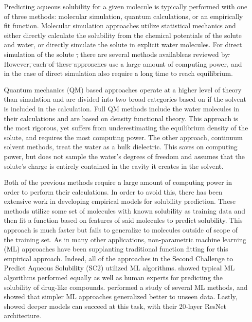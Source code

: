 \documentclass[journal=jcim,manuscript=applicationnotes]{achemso} %
\providecommand{\DIFaddtex}[1]{{\protect\color{blue}\uwave{#1}}} %
\providecommand{\DIFdeltex}[1]{{\protect\color{red}\sout{#1}}}                      %
\providecommand{\DIFaddbegin}{} %
\providecommand{\DIFaddend}{} %
\providecommand{\DIFdelbegin}{} %
\providecommand{\DIFdelend}{} %
\providecommand{\DIFadd}[1]{\texorpdfstring{\DIFaddtex{#1}}{#1}} %
\providecommand{\DIFdel}[1]{\texorpdfstring{\DIFdeltex{#1}}{}} %
\begin{document}
Predicting aqueous solubility for a given molecule is typically performed with one of three methods: molecular simulation, quantum calculations, or an empirically fit function.
Molecular simulation approaches utilize statistical mechanics and either directly calculate the solubility from the chemical potentials of the solute and water\cite{denseStates}, or directly simulate the solute in explicit water molecules.
For direct simulation of the solute \DIFdelbegin \DIFdel{, }\DIFdelend there are several methods available\DIFaddbegin \DIFadd{, }\DIFaddend as reviewed by\citet{solrev1}\DIFdelbegin \DIFdel{.
However, each of these approaches }\DIFdelend \DIFaddbegin \DIFadd{, which all }\DIFaddend use a large amount of computing power, and in the case of direct simulation also require a long time to reach equilibrium.

Quantum mechanics (QM) based approaches operate at a higher level of theory than simulation and are divided into two broad categories based on if the solvent is included in the calculation. 
Full QM methods include the water molecules in their calculations and are based on density functional theory\cite{solrev1}.
This approach is the most rigorous, yet suffers from underestimating the equilibrium density of the solute\cite{solrev1}, and requires the most computing power.
The other approach, continuum solvent methods, treat the water as a bulk dielectric.
This saves on computing power, but does not sample the water's degrees of freedom and assumes that the solute's charge is entirely contained in the cavity it creates in the solvent.

Both of the previous methods require a large amount of computing power in order to perform their calculations.
In order to avoid this, there has been extensive work in developing empirical models for solubility prediction\cite{solrev1,solrev2}.
These methods utilize some set of molecules with known solubility as training data and then fit a function based on features of said molecules to predict solubility.
This approach is much faster but fails to generalize to molecules outside of scope of the training set.
As in many other applications, non-parametric machine learning (ML) approaches have been supplanting traditional function fitting for this empirical approach.
Indeed, all of the approaches in the Second Challenge to Predict Aqueous Solubility (SC2) utilized ML algorithms.\cite{llinas}
\citet{boobier} showed typical ML algorithms performed equally as well as human experts for predicting the solubility of drug-like compounds.
\citet{lovric} performed a study of several ML methods, and showed that simpler ML approaches generalized better to unseen data.
Lastly, \citet{cui} showed deeper models can succeed at this task, with their 20-layer ResNet architecture.
\end{document}
